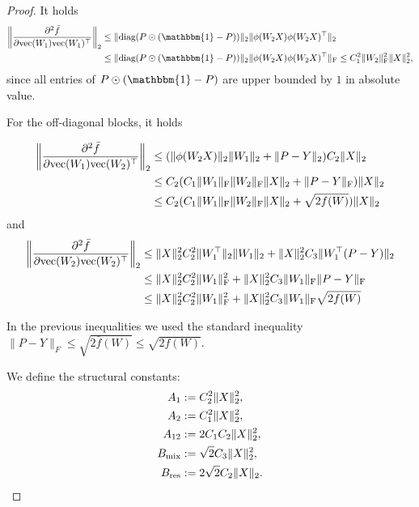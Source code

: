\documentclass[a4paper,11pt]{article}
\DeclarePairedDelimiter{\norm}{\|}{\|}
\newcommand{\1}{\mathbbm{1}}
\theoremstyle{plain}
\begin{document}
\begin{proof}
It holds
\begin{align*}
    \left\|\frac{\partial^2 \bar f}{\partial \textnormal{vec}(W_1) \textnormal{vec}(W_1)^\top } \right\|_2 & \leq \|\textnormal{diag}(P \odot (\1-P))\|_2 \|\phi(W_2 X) \phi(W_2 X)^\top\|_2 \\ &  \leq \|\textnormal{diag}(P \odot (\1-P))\|_2 \|\phi(W_2 X) \phi(W_2 X)^\top\|_{\rm F} \leq C_1^2 \|W_2\|_{\rm F}^2 \|X\|_2^2,
\end{align*}
since all entries of $P \odot (\1-P)$ are upper bounded by $1$ in absolute value.

For the off-diagonal blocks, it holds

\begin{align*}
    \left\|\frac{\partial^2 \bar f}{\partial \textnormal{vec}(W_1) \textnormal{vec}(W_2)^\top } \right\|_2 & \leq ( \|\phi(W_2 X)\|_2 \|W_1\|_2 + \|P - Y\|_2) C_2 \|X\|_2\\ & \leq C_2 (C_1 \|W_1\|_{\rm F} \|W_2\|_{\rm F} \|X\|_2 + \|P - Y\|_{\rm F}) \|X\|_2 \\ & \leq C_2 (C_1 \|W_1\|_{\rm F} \|W_2\|_{\rm F} \|X\|_2 + \sqrt{2f(W)}) \|X\|_2
\end{align*}
and
\begin{align*}
    \left\|\frac{\partial^2 \bar f}{\partial \textnormal{vec}(W_2) \textnormal{vec}(W_2)^\top } \right\|_2 & \leq \|X\|^2_2 C_2^2 \|W_1^\top\|_2 \|W_1\|_2 + \|X\|^2_2 C_3 \|W_1^\top (P-Y)\|_2 \\ & \leq \|X\|^2_2 C_2^2 \|W_1\|^2_{\rm F} + \|X\|^2_2 C_3 \|W_1\|_{\rm F} \|P-Y\|_{\rm F} \\ & \leq \|X\|^2_2 C_2^2 \|W_1\|^2_{\rm F} + \|X\|^2_2 C_3 \|W_1\|_{\rm F} \sqrt{2 f(W)}
\end{align*}

In the previous inequalities we used the standard inequality $\|P-Y\|_F \leq \sqrt{2 \bar f(W)} \leq \sqrt{2f(W)}$. 

We define the structural constants:
\begin{align}
\label{eq:CE_regularization_constants}
    A_1 &:= C_2^2 \norm{X}^2_2, \nonumber \\
    A_2 &:= C_1^2 \norm{X}^2_2, \nonumber\\
    A_{12} &:= 2 C_1 C_2 \norm{X}^2_2, \nonumber\\
    B_{\text{mix}} &:= \sqrt{2} C_3 \norm{X}^2_2, \nonumber\\
    B_{\text{res}} &:= 2\sqrt{2} C_2 \norm{X}_2.
\end{align}


\end{proof}
\end{document}
